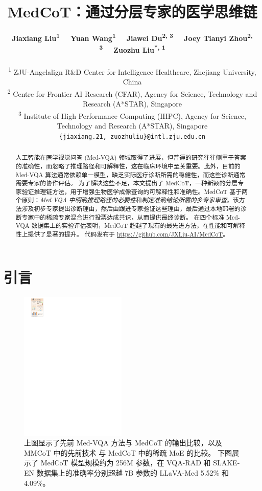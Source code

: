 \documentclass[11pt]{article}
\title{
MedCoT：通过分层专家的医学思维链
}
\author{
 \textbf{Jiaxiang Liu\textsuperscript{1}}\ \ \
 \textbf{Yuan Wang\textsuperscript{1}}\ \ \
 \textbf{Jiawei Du\textsuperscript{2, 3}}\ \ \
 \textbf{Joey Tianyi Zhou\textsuperscript{2, 3}}\ \ \
 \textbf{Zuozhu Liu\textsuperscript{*, 1}}
\\
\\
 \textsuperscript{1} \small ZJU-Angelalign R\&D Center for Intelligence Healthcare, Zhejiang University, China\\
 \textsuperscript{2} \small Centre for Frontier AI Research (CFAR), Agency for Science, Technology and Research (A*STAR), Singapore
\\
 \textsuperscript{3} \small Institute of High Performance Computing (IHPC), Agency for Science, Technology and Research (A*STAR), Singapore
\\
 { \small
   {\tt \{jiaxiang.21, zuozhuliu\}@intl.zju.edu.cn}
 }
}
\begin{document}
\maketitle

\begin{abstract}
人工智能在医学视觉问答 (Med-VQA) 领域取得了进展，但普遍的研究往往侧重于答案的准确性，而忽略了推理路径和可解释性，这在临床环境中至关重要。此外，目前的 Med-VQA 算法通常依赖单一模型，缺乏实际医疗诊断所需的稳健性，而这些诊断通常需要专家的协作评估。
为了解决这些不足，本文提出了 MedCoT，一种新颖的分层专家验证推理链方法，用于增强生物医学成像查询的可解释性和准确性。MedCoT 基于两个原则：\textit{Med-VQA 中明确推理路径的必要性}和\textit{制定准确结论所需的多专家审查}。该方法涉及初步专家提出诊断理由，然后由跟进专家验证这些理由，最后通过本地部署的诊断专家中的稀疏专家混合进行投票达成共识，从而提供最终诊断。
在四个标准 Med-VQA 数据集上的实验评估表明，MedCoT 超越了现有的最先进方法，在性能和可解释性上提供了显著的提升。
代码发布于 \url{https://github.com/JXLiu-AI/MedCoT}。
\let\thefootnote\relax\footnotetext{* 责任作者。}
\end{abstract}
\section{引言}

\begin{figure}[t!]
\centering
\includegraphics[width=0.45\textwidth]{image/Figure_1_v7.pdf}
\caption{
上图显示了先前 Med-VQA 方法与 MedCoT 的输出比较，以及 MMCoT 中的先前技术 \cite{zhang2023multimodal} 与 MedCoT 中的稀疏 MoE 的比较。
下图展示了 MedCoT 模型规模约为 256M 参数，在 VQA-RAD 和 SLAKE-EN 数据集上的准确率分别超越 7B 参数的 LLaVA-Med 5.52\% 和 4.09\%。
}
\label{fig1}
\end{figure}
\end{document}
